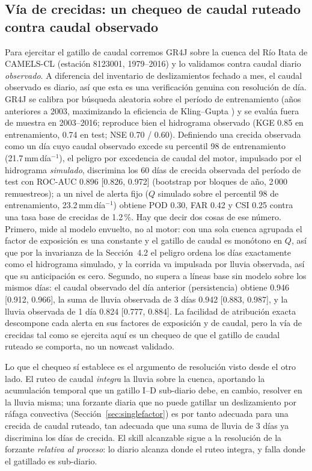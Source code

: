 \documentclass[authoryear,preprint,review,12pt]{elsarticle}
\begin{document}
\subsection{Vía de crecidas: un chequeo de caudal ruteado contra caudal observado}

Para ejercitar el gatillo de caudal corremos GR4J \citep{perrin2003} sobre la
cuenca del Río Itata de CAMELS-CL (estación 8123001, 1979--2016) y lo validamos
contra caudal diario \emph{observado}. A diferencia del inventario de
deslizamientos fechado a mes, el caudal observado es diario, así que esta es una
verificación genuina con resolución de día. GR4J se calibra por búsqueda aleatoria
sobre el período de entrenamiento (años anteriores a 2003, maximizando la
eficiencia de Kling--Gupta \citep{gupta2009}) y se evalúa fuera de muestra en
2003--2016; reproduce bien el hidrograma observado (KGE 0.85 en entrenamiento, 0.74
en test; NSE 0.70 / 0.60). Definiendo una crecida observada como un día cuyo caudal
observado excede su percentil 98 de entrenamiento (21.7\,mm\,día$^{-1}$), el peligro
por excedencia de caudal del motor, impulsado por el hidrograma \emph{simulado},
discrimina los 60 días de crecida observada del período de test con ROC-AUC 0.896 [0.826, 0.972] (bootstrap por bloques de año, 2\,000 remuestreos); a
un nivel de alerta fijo ($Q$ simulado sobre el percentil 98 de entrenamiento,
23.2\,mm\,día$^{-1}$) obtiene POD 0.30, FAR 0.42 y CSI 0.25 contra una tasa base de
crecidas de 1.2\,\%. Hay que decir dos cosas de ese número. Primero, mide al modelo
envuelto, no al motor: con una sola cuenca agrupada el factor de exposición es una
constante y el gatillo de caudal es monótono en $Q$, así que por la invarianza de la
Sección~4.2 el peligro ordena los días exactamente como el hidrograma simulado, y la
corrida va impulsada por lluvia observada, así que su anticipación es cero. Segundo,
no supera a líneas base sin modelo sobre los mismos días: el caudal observado del
día anterior (persistencia) obtiene 0.946 [0.912, 0.966], la suma de lluvia
observada de 3 días 0.942 [0.883, 0.987], y la lluvia observada de 1 día
0.824 [0.777, 0.884]. La facilidad de atribución exacta descompone cada alerta en
sus factores de exposición y de caudal, pero la vía de crecidas tal como se ejercita
aquí es un chequeo de que el gatillo de caudal ruteado se comporta, no un nowcast
validado.

Lo que el chequeo sí establece es el argumento de resolución visto desde el otro lado. El ruteo de
caudal \emph{integra} la lluvia sobre la cuenca, aportando la acumulación temporal
que un gatillo I--D sub-diario debe, en cambio, resolver en la lluvia misma; una
forzante diaria que no puede gatillar un deslizamiento por ráfaga convectiva
(Sección~\ref{sec:singlefactor}) es por tanto adecuada para una crecida de caudal
ruteado, tan adecuada que una suma de lluvia de 3 días ya discrimina los días de crecida. El skill alcanzable sigue a la resolución de la forzante \emph{relativa al
proceso}: lo diario alcanza donde el ruteo integra, y falla donde el gatillado es
sub-diario.
\end{document}
